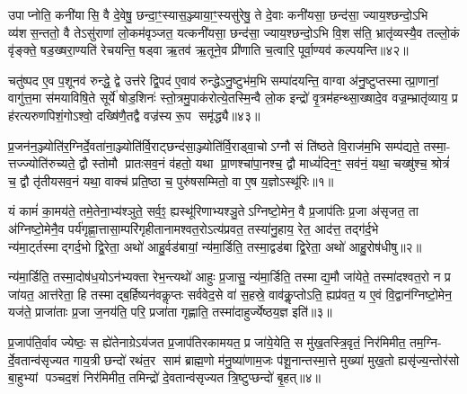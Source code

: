 उपाप्नोति॒ कनी॑यासि॒ वै दे॒वेषु॒ छन्दा॒ꣳ॒स्यास॒ञ्ज्याया॒ꣳ॒स्यसु॑रेषु॒ ते दे॒वाः कनी॑यसा॒ छन्द॑सा॒ ज्याय॒श्छन्दो॒ऽभि व्य॑शस॒न्ततो॒ वै तेऽसु॑राणां लो॒कम॑वृञ्जत॒ यत्कनी॑यसा॒ छन्द॑सा॒ ज्याय॒श्छन्दो॒ऽभि वि॒शस॑ति॒ भ्रातृ॑व्यस्यै॒व तल्लो॒कं वृ॑ङ्क्ते॒ षड॒ख्षरा॒ण्यति॑ रेचयन्ति॒ षड्वा ऋ॒तव॑ ऋ॒तूने॒व प्री॑णाति च॒त्वारि॒ पूर्वा॒ण्यव॑ कल्पयन्ति॥४२॥

चतु॑ष्पद ए॒व प॒शूनव॑ रुन्द्धे॒ द्वे उत्त॑रे द्वि॒पद॑ ए॒वाव॑ रुन्द्धेऽनु॒ष्टुभ॑म॒भि सम्पा॑दयन्ति॒ वाग्वा अ॑नु॒ष्टुप्तस्मात्प्रा॒णानां॒ वागु॑त्त॒मा स॑मयाविषि॒ते सूर्ये॑ षोड॒शिनः॑ स्तो॒त्रमु॒पाक॑रोत्ये॒तस्मि॒न्वै लो॒क इन्द्रो॑ वृ॒त्रम॑हन्थ्सा॒ख्षादे॒व वज्र॒म्भ्रातृ॑व्याय॒ प्र ह॑रत्यरुणपिशं॒गोऽश्वो॒ दख्षि॑णै॒तद्वै वज्र॑स्य रू॒प समृ॑द्ध्यै॥४३॥


{\anuvakamend[{लो॒को वि॒दुषः॑ षोड॒शी गृ॒ह्यते॒ यदु॒क्थ्ये॑ धाम॑ कल्पयन्ति स॒प्तच॑त्वारिशच्च॥11॥}]}

{\anuvakamend[{Wrtः ःsrpton ॑out Pr॒sn॒}]}

\setcounter{anuvakam}{0}
प्र॒जन॑न॒ञ्ज्योति॑र॒ग्निर्दे॒वता॑ना॒ञ्ज्योति॑र्वि॒राट्छन्द॑सा॒ञ्ज्योति॑र्वि॒राड्वा॒चोऽग्नौ सं ति॑ष्ठते वि॒राज॑म॒भि सम्प॑द्यते॒ तस्मा॒- त्तज्ज्योति॑रुच्यते॒ द्वौ स्तोमौ प्रातःसव॒नं व॑हतो॒ यथा प्रा॒णश्चा॑पा॒नश्च॒ द्वौ माध्यं॑दिन॒ꣳ॒ सव॑नं॒ यथा॒ चख्षु॑श्च॒ श्रोत्रं॑ च॒ द्वौ तृ॑तीयसव॒नं यथा॒ वाक्च॑ प्रति॒ष्ठा च॒ पुरु॑षसम्मितो॒ वा ए॒ष य॒ज्ञोऽस्थू॑रिः॥१॥

यं कामं॑ का॒मय॑ते॒ तमे॒तेना॒भ्य॑श्ञुते॒ सर्व॒ꣵ॒ ह्यस्थू॑रिणाभ्यश्ञु॒तेऽग्निष्टो॒मेन॒ वै प्र॒जाप॑तिः प्र॒जा अ॑सृजत॒ ता अ॑ग्निष्टो॒मेनै॒व पर्य॑गृह्णा॒त्तासा॒म्परि॑गृहीतानामश्वत॒रोऽत्य॑प्रवत॒ तस्या॑नु॒हाय॒ रेत॒ आद॑त्त॒ तद्ग॑र्द॒भे न्य॑मा॒र्ट्तस्माद्गर्द॒भो द्वि॒रेता॒ अथो॑ आहु॒र्वड॑बायां॒ न्य॑मा॒र्डिति॒ तस्मा॒द्वड॑बा द्वि॒रेता॒ अथो॑ आहु॒रोष॑धीषु॥२॥

न्य॑मा॒र्डिति॒ तस्मा॒दोष॑ध॒योऽन॑भ्यक्ता रेभ॒न्त्यथो॑ आहुः प्र॒जासु॒ न्य॑मा॒र्डिति॒ तस्माद्य॒मौ जा॑येते॒ तस्मा॑दश्वत॒रो न प्र जा॑यत॒ आत्त॑रेता॒ हि तस्माद्ब॒र्\mbox{}हिष्यन॑वकॢप्तः सर्ववेद॒से वा॑ स॒हस्रे॒ वाव॑कॢ॒प्तोऽति॒ ह्यप्र॑वत॒ य ए॒वं वि॒द्वान॑ग्निष्टो॒मेन॒ यज॑ते॒ प्राजा॑ताः प्र॒जा ज॒नय॑ति॒ परि॒ प्रजा॑ता गृह्णाति॒ तस्मा॑दाहुर्ज्येष्ठय॒ज्ञ इति॑॥३॥

प्र॒जाप॑ति॒र्वाव ज्येष्ठः॒ स ह्ये॑तेनाग्रेऽय॑जत प्र॒जाप॑तिरकामयत॒ प्र जा॑ये॒येति॒ स मु॑ख॒तस्त्रि॒वृतं॒ निर॑मिमीत॒ तम॒ग्नि- र्दे॒वतान्व॑सृज्यत गाय॒त्री छन्दो॑ रथंत॒र साम॑ ब्राह्म॒णो म॑नु॒ष्या॑णाम॒जः प॑शू॒नान्तस्मा॒त्ते मुख्या॑ मुख॒तो ह्यसृ॑ज्य॒न्तोर॑सो बा॒हुभ्यां पञ्चद॒शं निर॑मिमीत॒ तमिन्द्रो॑ दे॒वतान्व॑सृज्यत त्रि॒ष्टुप्छन्दो॑ बृ॒हत्॥४॥

